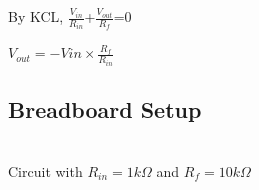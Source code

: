 \documentclass{article}
\begin{document}
\noindent
By KCL, $\frac{V_{in}}{R_{in}}$+$\frac{V_{out}}{R_{f}}$=0 \\

\begin{center}
    \textbf{$V_{out}=-V{in}\times\frac{R_{f}}{R_{in}}$}
\end{center}

\subsection{Breadboard Setup}
\vspace{5px}
\begin{center}
 \\ \vspace{5px}
Circuit with $R_{in}=1k\Omega$ and $R_{f}=10k\Omega$\\
\end{center}

\newpage
\end{document}

